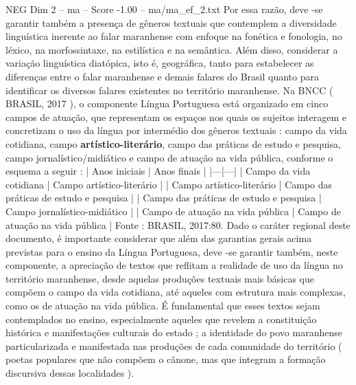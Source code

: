 \begin{textsample}{NEG Dim 2 – ma – Score -1.00 – ma/ma\_ef\_2.txt}
Por essa razão, deve -se garantir também a presença de gêneros textuais que contemplem a diversidade linguística inerente ao falar maranhense com enfoque na fonética e fonologia, no léxico, na morfossintaxe, na estilística e na semântica.
Além disso, considerar a variação linguística diatópica, isto é, geográfica, tanto para estabelecer as diferenças entre o falar maranhense e demais falares do Brasil quanto para identificar os diversos falares existentes no território maranhense.
Na BNCC ( BRASIL, 2017 ), o componente Língua Portuguesa está organizado em cinco campos de atuação, que representam os espaços nos quais os sujeitos interagem e concretizam o uso da língua por intermédio dos gêneros textuais : campo da vida cotidiana, campo \textbf{artístico-literário}, campo das práticas de estudo e pesquisa, campo jornalístico/midiático e campo de atuação na vida pública, conforme o esquema a seguir : | Anos iniciais | Anos finais | |---|---| | Campo da vida cotidiana | Campo artístico-literário | | Campo artístico-literário | Campo das práticas de estudo e pesquisa | | Campo das práticas de estudo e pesquisa | Campo jornalístico-midiático | | Campo de atuação na vida pública | Campo de atuação na vida pública | Fonte : BRASIL, 2017:80.
Dado o caráter regional deste documento, é importante considerar que além das garantias gerais acima previstas para o ensino da Língua Portuguesa, deve -se garantir também, neste componente, a apreciação de textos que reflitam a realidade de uso da língua no território maranhense, desde aquelas produções textuais mais básicas que compõem o campo da vida cotidiana, até aqueles com estrutura mais complexas, como os de atuação na vida pública.
É fundamental que esses textos sejam contemplados no ensino, especialmente aqueles que revelem a constituição histórica e manifestações culturais do estado ; a identidade do povo maranhense particularizada e manifestada nas produções de cada comunidade do território ( poetas populares que não compõem o cânone, mas que integram a formação discursiva dessas localidades ).

\end{textsample}
